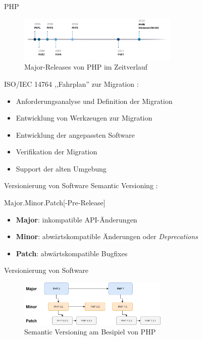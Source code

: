 \begin{frame}{PHP}
    \begin{figure}
        \centering
        \includegraphics[width=290px]{img/timeline.png}	
        \caption{Major-Releases von PHP im Zeitverlauf}		
    \end{figure}
\end{frame}

\begin{frame}{ISO/IEC 14764}
    ,,Fahrplan'' zur Migration \nocite{iso/iec_iso/iec/ieee_2006}:
    \begin{itemize}
        \item Anforderungsanalyse und Definition der Migration
        \item Entwicklung von Werkzeugen zur Migration
        \item Entwicklung der angepassten Software
        \item Verifikation der Migration
        \item Support der alten Umgebung
    \end{itemize}
\end{frame}

\begin{frame}{Versionierung von Software}
    Semantic Versioning \nocite{preston-werner_semantic_nodate}:
    \begin{center}
        \alert{Major.Minor.Patch[-Pre-Release]}
    \end{center}
    \begin{itemize}
        \item \textbf{Major}: inkompatible API-Änderungen
        \item \textbf{Minor}: abwärtskompatible Änderungen oder \emph{Deprecations}
        \item \textbf{Patch}: abwärtskompatible Bugfixes
    \end{itemize}
\end{frame}

\begin{frame}{Versionierung von Software}
    \begin{figure}
        \centering
        \includegraphics[width=270px]{img/semVer2.png}
        \caption{Semantic Versioning am Besipiel von PHP}			
    \end{figure}
\end{frame}